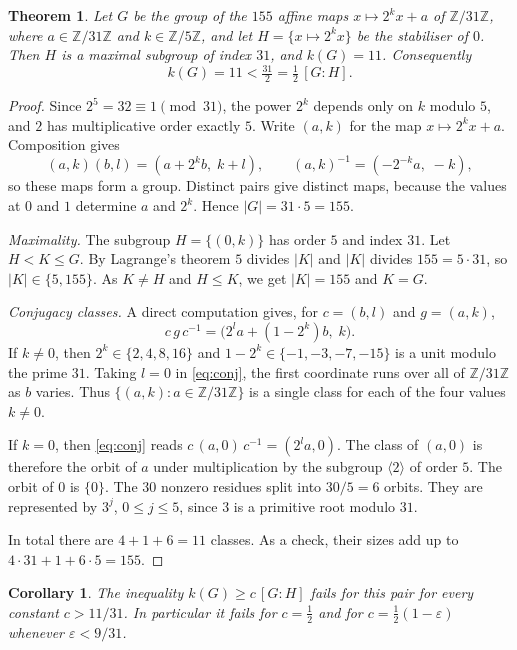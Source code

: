 \documentclass[11pt]{article}
\newtheorem{theorem}{Theorem}
\newtheorem{corollary}{Corollary}
\theoremstyle{remark}
\begin{document}
\begin{theorem}
Let $G$ be the group of the $155$ affine maps
$x\mapsto 2^{k}x+a$ of $\mathbb Z/31\mathbb Z$, where
$a\in\mathbb Z/31\mathbb Z$ and $k\in\mathbb Z/5\mathbb Z$, and let
$H=\{x\mapsto 2^{k}x\}$ be the stabiliser of $0$. Then $H$ is a maximal
subgroup of index $31$, and $k(G)=11$. Consequently
\[
 k(G)=11<\tfrac{31}{2}=\tfrac12\,[G:H].
\]
\end{theorem}
\begin{proof}
Since $2^5=32\equiv1\pmod{31}$, the power $2^k$ depends only on $k$
modulo $5$, and $2$ has multiplicative order exactly $5$. Write $(a,k)$
for the map $x\mapsto2^kx+a$. Composition gives
\[
 (a,k)(b,l)=(a+2^kb,\;k+l),\qquad (a,k)^{-1}=(-2^{-k}a,\;-k),
\]
so these maps form a group. Distinct pairs give distinct maps, because
the values at $0$ and $1$ determine $a$ and $2^k$. Hence $|G|=31\cdot5=155$.

\emph{Maximality.} The subgroup $H=\{(0,k)\}$ has order $5$ and index
$31$. Let $H<K\le G$. By Lagrange's theorem $5$ divides $|K|$ and $|K|$
divides $155=5\cdot31$, so $|K|\in\{5,155\}$. As $K\ne H$ and $H\le K$,
we get $|K|=155$ and $K=G$.

\emph{Conjugacy classes.} A direct computation gives, for $c=(b,l)$ and
$g=(a,k)$,
\begin{equation}\label{eq:conj}
 c\,g\,c^{-1}=\bigl(2^{l}a+(1-2^{k})b,\;k\bigr).
\end{equation}
If $k\ne0$, then $2^k\in\{2,4,8,16\}$ and
$1-2^k\in\{-1,-3,-7,-15\}$ is a unit modulo the prime $31$. Taking
$l=0$ in \eqref{eq:conj}, the first coordinate runs over all of
$\mathbb Z/31\mathbb Z$ as $b$ varies. Thus $\{(a,k):a\in\mathbb
Z/31\mathbb Z\}$ is a single class for each of the four values
$k\ne0$.

If $k=0$, then \eqref{eq:conj} reads $c\,(a,0)\,c^{-1}=(2^{l}a,0)$. The
class of $(a,0)$ is therefore the orbit of $a$ under multiplication by
the subgroup $\langle2\rangle$ of order $5$. The orbit of $0$ is
$\{0\}$. The $30$ nonzero residues split into $30/5=6$ orbits.
They are represented by $3^{j}$, $0\le j\le5$, since $3$ is a primitive
root modulo $31$.

In total there are $4+1+6=11$ classes. As a check, their sizes add up to
$4\cdot31+1+6\cdot5=155$.
\end{proof}

\begin{corollary}
The inequality $k(G)\ge c\,[G:H]$ fails for this pair for every constant
$c>11/31$. In particular it fails for $c=\tfrac12$ and for
$c=\tfrac12(1-\varepsilon)$ whenever $\varepsilon<9/31$.
\end{corollary}
\end{document}
